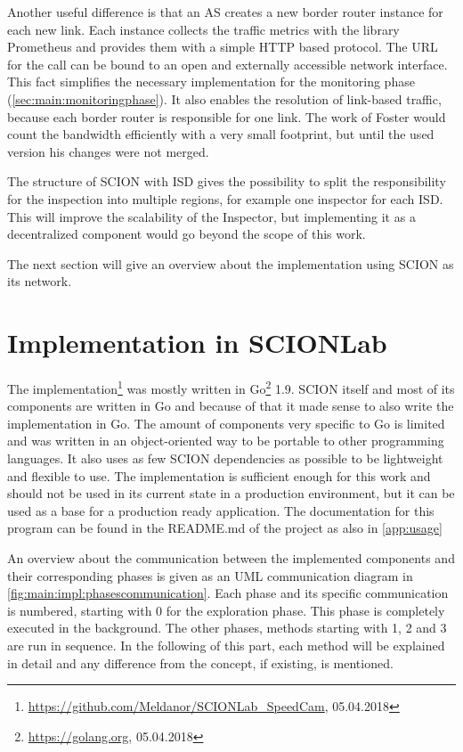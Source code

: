 \documentclass[thesis.tex]{subfiles}
\begin{document}
Another useful difference is that an AS creates a new border router instance for each new link. Each instance collects the traffic metrics with the library Prometheus and provides them with a simple HTTP based protocol. The URL for the call can be bound to an open and externally accessible network interface. This fact simplifies the necessary implementation for the monitoring phase (\autoref{sec:main:monitoringphase}). It also enables the resolution of link-based traffic, because each border router is responsible for one link. The work of Foster\cite{Forster.September2017} would count the bandwidth efficiently with a very small footprint, but until the used version his changes were not merged. 

The structure of SCION with ISD gives the possibility to split the responsibility for the inspection into multiple regions, for example one inspector for each ISD. This will improve the scalability of the Inspector, but implementing it as a decentralized component would go beyond the scope of this work.

The next section will give an overview about the implementation using SCION as its network.

\section{Implementation in SCIONLab} \label{sec:main:scionlabimpl}

The implementation\footnote{\url{https://github.com/Meldanor/SCIONLab_SpeedCam}, 05.04.2018} was mostly written in Go\footnote{\url{https://golang.org}, 05.04.2018} 1.9. SCION itself and most of its components are written in Go and because of that it made sense to also write the implementation in Go. The amount of components very specific to Go is limited and was written in an object-oriented way to be portable to other programming languages. It also uses as few SCION dependencies as possible to be lightweight and flexible to use. The implementation is sufficient enough for this work and should not be used in its current state in a production environment, but it can be used as a base for a production ready application. The documentation for this program can be found in the README.md of the project as also in \autoref{app:usage}

An overview about the communication between the implemented components and their corresponding phases is given as an UML communication diagram in \autoref{fig:main:impl:phasescommunication}. Each phase and its specific communication is numbered, starting with 0 for the exploration phase. This phase is completely executed in the background. The other phases, methods starting with 1, 2 and 3 are run in sequence. In the following of this part, each method will be explained in detail and any difference from the concept, if existing, is mentioned.
\end{document}
